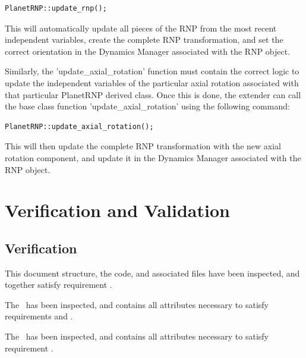 \begin{verbatim}
PlanetRNP::update_rnp();
\end{verbatim}

This will automatically update all pieces of the RNP from the most recent
independent variables, create the complete RNP transformation, and set the 
correct
orientation in the Dynamics Manager associated with the RNP object.

Similarly, the 'update\_axial\_rotation' function must contain the correct
logic to update the independent variables of the particular axial rotation
associated with that particular PlanetRNP derived class. Once this is done,
the extender can call the base class function 'update\_axial\_rotation'
using the following command:

\begin{verbatim}
PlanetRNP::update_axial_rotation();
\end{verbatim}

This will then update the complete RNP transformation with the
new axial rotation component, and update it in the
Dynamics Manager associated with the RNP object.


\chapter{Verification and Validation}\label{ch:ivv}

\section{Verification}
\label{inspect:TLI}
This document structure, the code, and associated files have been inspected,
and together satisfy requirement .

\label{inspect:data}
The \ModelDesc\ has been inspected, and contains all attributes necessary to
satisfy requirements  and
.

\label{inspect:func}
The \ModelDesc\ has been inspected, and contains all attributes necessary to
satisfy requirement .


